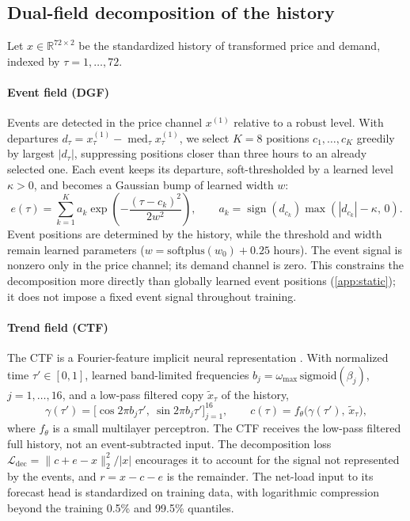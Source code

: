 \documentclass[preprint,12pt]{elsarticle}
\DeclareMathOperator{\med}{med}
\begin{document}
\subsection{Dual-field decomposition of the history}
Let $x\in\mathbb{R}^{72\times 2}$ be the standardized history of transformed price and demand, indexed by $\tau=1,\dots,72$.

\paragraph{Event field (DGF)} Events are detected in the price channel $x^{(1)}$ relative to a robust level. With departures $d_\tau=x^{(1)}_\tau-\med_\tau x^{(1)}_\tau$, we select $K=8$ positions $c_1,\dots,c_K$ greedily by largest $|d_\tau|$, suppressing positions closer than three hours to an already selected one. Each event keeps its departure, soft-thresholded by a learned level $\kappa>0$, and becomes a Gaussian bump of learned width $w$:
\begin{equation}
e(\tau)=\sum_{k=1}^{K} a_k \exp\!\left(-\frac{(\tau-c_k)^2}{2w^2}\right),\qquad a_k=\operatorname{sign}(d_{c_k})\max\!\left(|d_{c_k}|-\kappa,\,0\right).
\end{equation}
Event positions are determined by the history, while the threshold and width remain learned parameters ($w=\mathrm{softplus}(w_0)+0.25$ hours). The event signal is nonzero only in the price channel; its demand channel is zero. This constrains the decomposition more directly than globally learned event positions (\ref{app:static}); it does not impose a fixed event signal throughout training.

\paragraph{Trend field (CTF)} The CTF is a Fourier-feature implicit neural representation \citep{tancik2020fourier,zhang2026dualtimesfield}. With normalized time $\tau'\in[0,1]$, learned band-limited frequencies $b_j=\omega_{\max}\,\mathrm{sigmoid}(\beta_j)$, $j=1,\dots,16$, and a low-pass filtered copy $\tilde x_\tau$ of the history,
\begin{equation}
\gamma(\tau')=\big[\cos 2\pi b_j\tau',\ \sin 2\pi b_j\tau'\big]_{j=1}^{16},\qquad c(\tau)=f_\theta\big(\gamma(\tau'),\,\tilde x_\tau\big),
\end{equation}
where $f_\theta$ is a small multilayer perceptron. The CTF receives the low-pass filtered full history, not an event-subtracted input. The decomposition loss $\mathcal{L}_{\mathrm{dec}}=\|c+e-x\|_2^2/|x|$ encourages it to account for the signal not represented by the events, and $r=x-c-e$ is the remainder. The net-load input to its forecast head is standardized on training data, with logarithmic compression beyond the training 0.5\% and 99.5\% quantiles.
\end{document}
